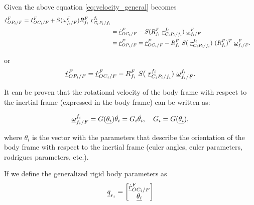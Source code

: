 Given the above equation \eqref{eq:velocity_general} becomes
\begin{align*}
    \pvec{\dot{r}}{OP_{i}}{F}{F} = \pvec{\dot{r}}{OC_{i}}{F}{F} + 
    S(\pvec{\omega}{f_{i}}{F}{F}) \rot{R}{f_{i}}{F} \ \pvec{r}{C_{i}P_{i}}{f_i}{f_i} \\
    & = \pvec{\dot{r}}{OC_{i}}{F}{F} - S(\rot{R}{f_{i}}{F} \ \pvec{r}{C_{i}P_{i}}{f_i}{f_i}) \ \pvec{\omega}{f_{i}}{F}{F} \\ 
    & = \pvec{\dot{r}}{OP_{i}}{F}{F} = \pvec{\dot{r}}{OC_{i}}{F}{F} -
    \rot{R}{f_{i}}{F} \ S( \ \pvec{r}{C_{i}P_{i}}{f_i}{f_i}) \ (\rot{R}{f_{i}}{F})^{T} \ \pvec{\omega}{f_{i}}{F}{F}.  
\end{align*}

or
\begin{equation}
    \pvec{\dot{r}}{OP_{i}}{F}{F} = \pvec{\dot{r}}{OC_{i}}{F}{F} - 
    \rot{R}{f_{i}}{F} \ S( \ \pvec{r}{C_{i}P_{i}}{f_i}{f_i})\ \pvec{\omega}{f_{i}}{F}{f_i}.
    \label{eq:velocity_rigid_body}
\end{equation}

It can be proven that the rotational velocity of the body frame with respect to
the inertial frame (expressed in the body frame) can be written as:

\begin{equation}
    \pvec{\omega}{f_{i}}{F}{f_i} = G(\vecd{\theta_{i}})\dot{\theta_{i}} = 
    G_{i}\dot{\theta_{i}}, \quad G_{i} = G(\vecd{\theta_{i}}),  
    \label{eq:angular_velocity_expression}
\end{equation}

where $\theta_{i}$ is the vector with the parameters that describe the orientation 
of the body frame with respect to the inertial frame (euler angles, euler parameters,
rodrigues parameters, etc.).

If we define the generalized rigid body parameters as 
\begin{equation}
    \vecd{q}_{r_{i}} = \begin{bmatrix}
        \pvec{\dot{r}}{OC_{i}}{F}{F} \\  \vecd{\theta_{i}}
    \end{bmatrix}
\end{equation}
    
    


